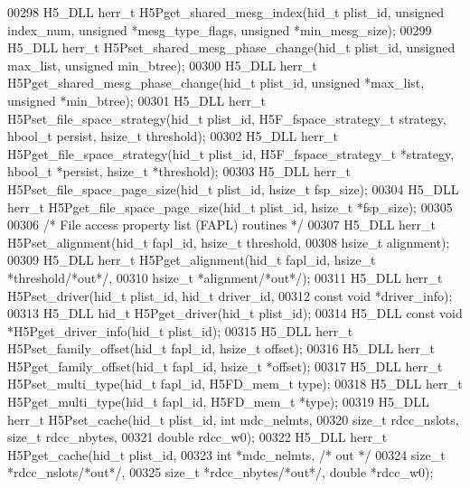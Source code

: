 \begin{DoxyCode}
00298 H5\_DLL herr\_t H5Pget\_shared\_mesg\_index(hid\_t plist\_id, \textcolor{keywordtype}{unsigned} index\_num, \textcolor{keywordtype}{unsigned} *mesg\_type\_flags, \textcolor{keywordtype}{
      unsigned} *min\_mesg\_size);
00299 H5\_DLL herr\_t H5Pset\_shared\_mesg\_phase\_change(hid\_t plist\_id, \textcolor{keywordtype}{unsigned} max\_list, \textcolor{keywordtype}{unsigned} min\_btree);
00300 H5\_DLL herr\_t H5Pget\_shared\_mesg\_phase\_change(hid\_t plist\_id, \textcolor{keywordtype}{unsigned} *max\_list, \textcolor{keywordtype}{unsigned} *min\_btree);
00301 H5\_DLL herr\_t H5Pset\_file\_space\_strategy(hid\_t plist\_id, H5F\_fspace\_strategy\_t strategy, hbool\_t persist, 
      hsize\_t threshold);
00302 H5\_DLL herr\_t H5Pget\_file\_space\_strategy(hid\_t plist\_id, H5F\_fspace\_strategy\_t *strategy, hbool\_t *persist,
       hsize\_t *threshold);
00303 H5\_DLL herr\_t H5Pset\_file\_space\_page\_size(hid\_t plist\_id, hsize\_t fsp\_size);
00304 H5\_DLL herr\_t H5Pget\_file\_space\_page\_size(hid\_t plist\_id, hsize\_t *fsp\_size);
00305 
00306 \textcolor{comment}{/* File access property list (FAPL) routines */}
00307 H5\_DLL herr\_t H5Pset\_alignment(hid\_t fapl\_id, hsize\_t threshold,
00308     hsize\_t alignment);
00309 H5\_DLL herr\_t H5Pget\_alignment(hid\_t fapl\_id, hsize\_t *threshold\textcolor{comment}{/*out*/},
00310     hsize\_t *alignment\textcolor{comment}{/*out*/});
00311 H5\_DLL herr\_t H5Pset\_driver(hid\_t plist\_id, hid\_t driver\_id,
00312         \textcolor{keyword}{const} \textcolor{keywordtype}{void} *driver\_info);
00313 H5\_DLL hid\_t H5Pget\_driver(hid\_t plist\_id);
00314 H5\_DLL \textcolor{keyword}{const} \textcolor{keywordtype}{void} *H5Pget\_driver\_info(hid\_t plist\_id);
00315 H5\_DLL herr\_t H5Pset\_family\_offset(hid\_t fapl\_id, hsize\_t offset);
00316 H5\_DLL herr\_t H5Pget\_family\_offset(hid\_t fapl\_id, hsize\_t *offset);
00317 H5\_DLL herr\_t H5Pset\_multi\_type(hid\_t fapl\_id, H5FD\_mem\_t type);
00318 H5\_DLL herr\_t H5Pget\_multi\_type(hid\_t fapl\_id, H5FD\_mem\_t *type);
00319 H5\_DLL herr\_t H5Pset\_cache(hid\_t plist\_id, \textcolor{keywordtype}{int} mdc\_nelmts,
00320        \textcolor{keywordtype}{size\_t} rdcc\_nslots, \textcolor{keywordtype}{size\_t} rdcc\_nbytes,
00321        \textcolor{keywordtype}{double} rdcc\_w0);
00322 H5\_DLL herr\_t H5Pget\_cache(hid\_t plist\_id,
00323        \textcolor{keywordtype}{int} *mdc\_nelmts, \textcolor{comment}{/* out */}
00324        \textcolor{keywordtype}{size\_t} *rdcc\_nslots\textcolor{comment}{/*out*/},
00325        \textcolor{keywordtype}{size\_t} *rdcc\_nbytes\textcolor{comment}{/*out*/}, \textcolor{keywordtype}{double} *rdcc\_w0);

\end{DoxyCode}
